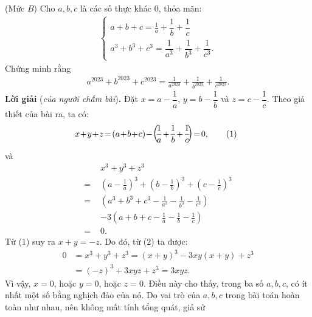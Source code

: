 \begin{multicols}{2}
	(Mức $B$)
	Cho $a, b, c$ là các số thực khác $0$, thỏa mãn:
	\begin{align*}
		\begin{cases}
			a + b + c = \frac{1}{a} + \dfrac{1}{b} + \dfrac{1}{c}\\
			{a^3} + {b^3} + {c^3} = \dfrac{1}{{{a^3}}} + \dfrac{1}{{{b^3}}} + \dfrac{1}{{{c^3}}}.
		\end{cases}
	\end{align*}
	Chứng minh rằng
	\begin{align*}
		{a^{2023}} \!+\! {b^{2023}} \!+\! {c^{2023}} \!=\! \frac{1}{{{a^{2023}}}} \!+\! \frac{1}{{{b^{2023}}}} \!+\! \frac{1}{{{c^{2023}}}}.
	\end{align*}
	\textbf{\color{thachthuctoanhoc}Lời giải} (\textit{của người chấm bài})\textbf{\color{thachthuctoanhoc}.}
	\vskip 0.05cm
	Đặt $x = a - \dfrac{1}{a}$, $y = b - \dfrac{1}{b}$  và $z = c - \dfrac{1}{c}$.
	\vskip 0.05cm
	Theo giả thiết của bài ra, ta có:
	\begin{align*}
		\hspace*{-5pt}x \!+\! y \!+\! z \!=\! \left( {a \!+\! b \!+\! c} \right) \!-\! \left(\!\! {\frac{1}{a} \!+\! \frac{1}{b} \!+\! \frac{1}{c}} \!\!\right) \!=\! 0, \tag{$1$}
	\end{align*}
	và
	\begin{align*}
		&{x^3} + {y^3} + {z^3} \\
		= \,&{\left( {a - \frac{1}{a}} \right)^3} + {\left( {b - \frac{1}{b}} \right)^3} + {\left( {c - \frac{1}{c}} \right)^3}\\
		= \,&\left( {{a^3} + {b^3} + {c^3} - \frac{1}{{{a^3}}} - \frac{1}{{{b^3}}} - \frac{1}{{{c^3}}}} \right) \\
		&- 3\left( {a + b + c - \frac{1}{a} - \frac{1}{b} - \frac{1}{c}} \right)\\
		 = \,\,& 0.\tag{$2$}
	\end{align*}
	Từ ($1$) suy ra $x + y = -z$. Do đó, từ ($2$) ta được:
	\begin{align*}
		0 &= {x^3} \!+\! {y^3} \!+\! {z^3} = {\left( {x \!+\! y} \right)^3} \!-\! 3xy\left( {x \!+\! y} \right) \!+\! {z^3} \\
		&= {\left( { - z} \right)^3} + 3xyz + {z^3} = 3xyz.
	\end{align*}
	Vì vậy, $x = 0$, hoặc $y = 0$, hoặc $z = 0$. Điều này cho thấy, trong ba số $a, b, c$, có ít nhất một số bằng nghịch đảo của nó.
	\vskip 0.05cm
	Do vai trò của $a, b, c$ trong bài toán hoàn toàn như nhau, nên không mất tính tổng quát, giả sử
	\begin{align*}

\end{align*}
\end{multicols}
